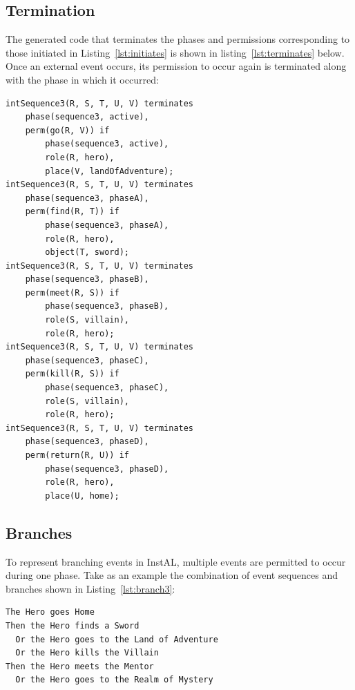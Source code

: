 \documentclass[11pt]{report}
\begin{document}
\subsection{Termination}
\label{sec:termination}

The generated code that terminates the phases and permissions corresponding to
those initiated in Listing~\ref{lst:initiates} is shown in
listing~\ref{lst:terminates} below. Once an external event occurs, its
permission to occur again is terminated along with the phase in which it occurred:

\begin{lstlisting}[label={lst:terminates}, caption={Institutional event
termination code for Listing~\ref{lst:seq4}}]
intSequence3(R, S, T, U, V) terminates
    phase(sequence3, active),
    perm(go(R, V)) if
        phase(sequence3, active),
        role(R, hero),
        place(V, landOfAdventure);
intSequence3(R, S, T, U, V) terminates
    phase(sequence3, phaseA),
    perm(find(R, T)) if
        phase(sequence3, phaseA),
        role(R, hero),
        object(T, sword);
intSequence3(R, S, T, U, V) terminates
    phase(sequence3, phaseB),
    perm(meet(R, S)) if
        phase(sequence3, phaseB),
        role(S, villain),
        role(R, hero);
intSequence3(R, S, T, U, V) terminates
    phase(sequence3, phaseC),
    perm(kill(R, S)) if
        phase(sequence3, phaseC),
        role(S, villain),
        role(R, hero);
intSequence3(R, S, T, U, V) terminates
    phase(sequence3, phaseD),
    perm(return(R, U)) if
        phase(sequence3, phaseD),
        role(R, hero),
        place(U, home);
\end{lstlisting}

\subsection{Branches}

To represent branching events in InstAL, multiple events are permitted to occur
during one phase. Take as an example the combination of event sequences and
branches shown in Listing~\ref{lst:branch3}:

\begin{lstlisting}
The Hero goes Home
Then the Hero finds a Sword
  Or the Hero goes to the Land of Adventure
  Or the Hero kills the Villain
Then the Hero meets the Mentor
  Or the Hero goes to the Realm of Mystery
\end{lstlisting}
\end{document}
